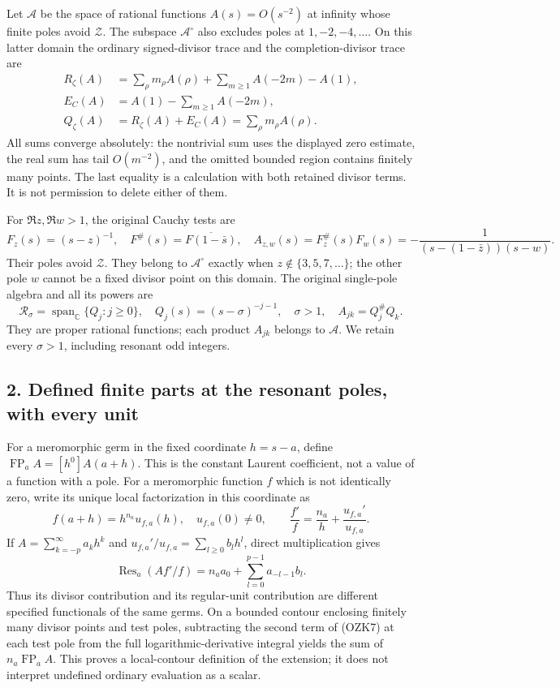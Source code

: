 \documentclass[
  10pt,
  a4paper,
]{article}
\begin{document}
Let \(\mathscr A\) be the space of rational functions \(A(s)=O(s^{-2})\)
at infinity whose finite poles avoid \(\mathcal Z\). The subspace
\(\mathscr A^\circ\) also excludes poles at \(1,-2,-4,\ldots\). On this
latter domain the ordinary signed-divisor trace and the
completion-divisor trace are \[
\begin{aligned}
R_\zeta(A)&=\sum_\rho m_\rho A(\rho)+\sum_{m\ge1}A(-2m)-A(1),\\
E_C(A)&=A(1)-\sum_{m\ge1}A(-2m),\\
Q_\zeta(A)&=R_\zeta(A)+E_C(A)=\sum_\rho m_\rho A(\rho).
\end{aligned}\tag{OZK3}
\] All sums converge absolutely: the nontrivial sum uses the displayed
zero estimate, the real sum has tail \(O(m^{-2})\), and the omitted
bounded region contains finitely many points. The last equality is a
calculation with both retained divisor terms. It is not permission to
delete either of them.

For \(\Re z,\Re w>1\), the original Cauchy tests are \[
F_z(s)=(s-z)^{-1},\quad
F^\#(s)=\overline{F(1-\bar s)},\quad
A_{z,w}(s)=F_z^\#(s)F_w(s)
=-\frac1{(s-(1-\bar z))(s-w)}.
\tag{OZK4}
\] Their poles avoid \(\mathcal Z\). They belong to \(\mathscr A^\circ\)
exactly when \(z\notin\{3,5,7,\ldots\}\); the other pole \(w\) cannot be
a fixed divisor point on this domain. The original single-pole algebra
and all its powers are \[
\mathcal R_\sigma=\operatorname{span}_{\mathbb C}\{Q_j:j\ge0\},
\quad Q_j(s)=(s-\sigma)^{-j-1},\quad \sigma>1,
\quad A_{jk}=Q_j^\#Q_k.
\tag{OZK5}
\] They are proper rational functions; each product \(A_{jk}\) belongs
to \(\mathscr A\). We retain every \(\sigma>1\), including resonant odd
integers.

\subsection{2. Defined finite parts at the resonant poles, with every
unit}\label{defined-finite-parts-at-the-resonant-poles-with-every-unit}

For a meromorphic germ in the fixed coordinate \(h=s-a\), define
\(\operatorname{FP}_a A=[h^0]A(a+h)\). This is the constant Laurent
coefficient, not a value of a function with a pole. For a meromorphic
function \(f\) which is not identically zero, write its unique local
factorization in this coordinate as \[
f(a+h)=h^{n_a}u_{f,a}(h),\quad u_{f,a}(0)\ne0,\qquad
\frac{f'}f=\frac{n_a}{h}+\frac{u_{f,a}'}{u_{f,a}}.
\tag{OZK6}
\] If \(A=\sum_{k=-p}^\infty a_kh^k\) and
\(u_{f,a}'/u_{f,a}=\sum_{l\ge0}b_lh^l\), direct multiplication gives \[
\operatorname{Res}_a(Af'/f)
=n_a a_0+\sum_{l=0}^{p-1}a_{-l-1}b_l.
\tag{OZK7}
\] Thus its divisor contribution and its regular-unit contribution are
different specified functionals of the same germs. On a bounded contour
enclosing finitely many divisor points and test poles, subtracting the
second term of (OZK7) at each test pole from the full
logarithmic-derivative integral yields the sum of
\(n_a\operatorname{FP}_aA\). This proves a local-contour definition of
the extension; it does not interpret undefined ordinary evaluation as a
scalar.
\end{document}
